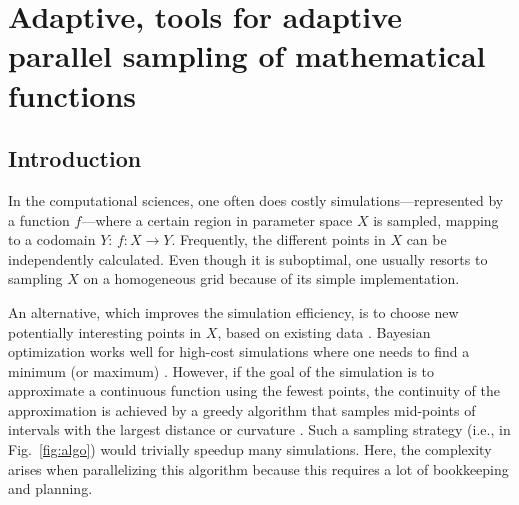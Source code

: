 \chapter{Adaptive, tools for adaptive parallel sampling of mathematical functions}
\label{ch:adaptive}

\newpage
\noindent
\section{Introduction}


In the computational sciences, one often does costly simulations---represented by a function $f$---where a certain region in parameter space $X$ is sampled, mapping to a codomain $Y$: $f \colon X \to Y$.
Frequently, the different points in $X$ can be independently calculated.
Even though it is suboptimal, one usually resorts to sampling $X$ on a homogeneous grid because of its simple implementation.


An alternative, which improves the simulation efficiency, is to choose new potentially interesting points in $X$, based on existing data \cite{Gramacy2004, Figueiredo1995, Castro2008, Chen2017}.
Bayesian optimization works well for high-cost simulations where one needs to find a minimum (or maximum) \cite{Takhtaganov2018}.
However, if the goal of the simulation is to approximate a continuous function using the fewest points, the continuity of the approximation is achieved by a greedy algorithm that samples mid-points of intervals with the largest distance or curvature \cite{Wolfram2011}.
Such a sampling strategy (i.e., in Fig.~\ref{fig:algo}) would trivially speedup many simulations.
Here, the complexity arises when parallelizing this algorithm because this requires a lot of bookkeeping and planning.

